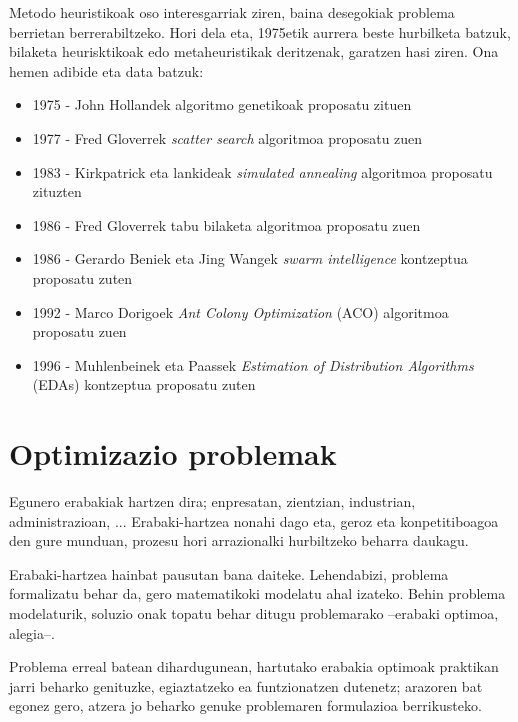 \documentclass[eu]{ifirak}\usepackage[]{graphicx}\usepackage[]{color}
\begin{document}
Metodo heuristikoak oso interesgarriak ziren, baina desegokiak problema berrietan berrerabiltzeko. Hori dela eta, 1975etik aurrera beste hurbilketa batzuk, bilaketa heurisktikoak edo metaheuristikak deritzenak, garatzen hasi ziren. Ona hemen adibide eta data batzuk:

\begin{itemize}
\item 1975 - John Hollandek algoritmo genetikoak proposatu zituen
\item 1977 - Fred Gloverrek \textit{scatter search} algoritmoa proposatu zuen
\item 1983 - Kirkpatrick eta lankideak \textit{simulated annealing} algoritmoa proposatu zituzten
\item 1986 - Fred Gloverrek tabu bilaketa algoritmoa proposatu zuen
\item 1986 - Gerardo Beniek eta Jing Wangek \textit{swarm intelligence} kontzeptua proposatu zuten
\item 1992 - Marco Dorigoek \textit{Ant Colony Optimization} (ACO) algoritmoa proposatu zuen
\item 1996 - Muhlenbeinek eta Paassek \textit{Estimation of Distribution Algorithms} (EDAs) kontzeptua proposatu zuten
\end{itemize}

\section{Optimizazio problemak}\label{sec:opt_problemak}

Egunero erabakiak hartzen dira; enpresatan, zientzian, industrian, administrazioan, ... Erabaki-hartzea nonahi dago eta, geroz eta konpetitiboagoa den gure munduan, prozesu hori arrazionalki hurbiltzeko beharra daukagu. 

Erabaki-hartzea hainbat pausutan bana daiteke. Lehendabizi, problema formalizatu behar da, gero matematikoki modelatu ahal izateko. Behin problema modelaturik, soluzio onak topatu behar ditugu problemarako --erabaki optimoa, alegia--. 

Problema erreal batean dihardugunean, hartutako erabakia optimoak praktikan jarri beharko genituzke, egiaztatzeko ea funtzionatzen dutenetz; arazoren bat egonez gero, atzera jo beharko genuke problemaren formulazioa berrikusteko.
\end{document}
